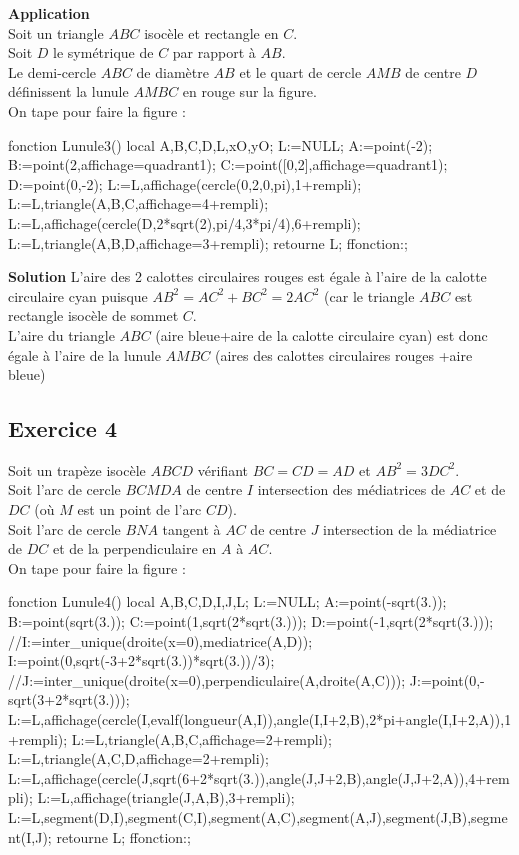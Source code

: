 \documentclass[12pt,a4paper]{book}
\begin{document}
\begin{giacjshere}
{\bf Application}\\
Soit un triangle $ABC$ isoc\`ele et rectangle en $C$.\\ 
Soit $D$ le sym\'etrique de $C$ par rapport \`a $AB$.\\
Le demi-cercle $ABC$ de diam\`etre $AB$ et le quart de cercle $AMB$ de centre
$D$ d\'efinissent la lunule $AMBC$ en rouge sur la figure.\\
On tape pour faire la figure :
\begin{giaconload}
fonction Lunule3()
local A,B,C,D,L,xO,yO;
L:=NULL;
A:=point(-2);
B:=point(2,affichage=quadrant1);
C:=point([0,2],affichage=quadrant1);
D:=point(0,-2);
L:=L,affichage(cercle(0,2,0,pi),1+rempli);
L:=L,triangle(A,B,C,affichage=4+rempli);
L:=L,affichage(cercle(D,2*sqrt(2),pi/4,3*pi/4),6+rempli);
L:=L,triangle(A,B,D,affichage=3+rempli);
retourne L;
ffonction:;
\end{giaconload}
{\bf Solution}
L'aire des 2 calottes circulaires rouges est \'egale \`a l'aire de la calotte
 circulaire cyan puisque $AB^2=AC^2+BC^2=2AC^2$ (car le triangle $ABC$ est 
rectangle isoc\`ele de sommet $C$.\\
L'aire du triangle $ABC$ (aire bleue+aire de la calotte circulaire cyan) est 
donc \'egale \`a l'aire de la lunule $AMBC$ (aires des calottes circulaires 
rouges +aire bleue)
\subsection{Exercice 4}
Soit un trap\`eze isoc\`ele $ABCD$ v\'erifiant $BC=CD=AD$ et $AB^2=3DC^2$.\\ 
Soit l'arc de cercle $BCMDA$ de centre $I$ intersection des m\'ediatrices de
$AC$ et de $DC$ (o\`u $M$ est un point de l'arc $CD$).\\
Soit l'arc de cercle $BNA$ tangent \`a $AC$ de centre $J$ intersection de la
m\'ediatrice de $DC$ et de la perpendiculaire en $A$ \`a $AC$.\\
On tape pour faire la figure :
\begin{giaconload}
fonction Lunule4()
local A,B,C,D,I,J,L;
L:=NULL;
A:=point(-sqrt(3.));
B:=point(sqrt(3.));
C:=point(1,sqrt(2*sqrt(3.)));
D:=point(-1,sqrt(2*sqrt(3.)));
//I:=inter_unique(droite(x=0),mediatrice(A,D));
I:=point(0,sqrt(-3+2*sqrt(3.))*sqrt(3.))/3);
//J:=inter_unique(droite(x=0),perpendiculaire(A,droite(A,C)));
J:=point(0,-sqrt(3+2*sqrt(3.)));
L:=L,affichage(cercle(I,evalf(longueur(A,I)),angle(I,I+2,B),2*pi+angle(I,I+2,A)),1+rempli);
L:=L,triangle(A,B,C,affichage=2+rempli);
L:=L,triangle(A,C,D,affichage=2+rempli);
L:=L,affichage(cercle(J,sqrt(6+2*sqrt(3.)),angle(J,J+2,B),angle(J,J+2,A)),4+rempli);
L:=L,affichage(triangle(J,A,B),3+rempli);
L:=L,segment(D,I),segment(C,I),segment(A,C),segment(A,J),segment(J,B),segment(I,J);
retourne L;
ffonction:;
\end{giaconload}


\end{giacjshere}
\end{document}
